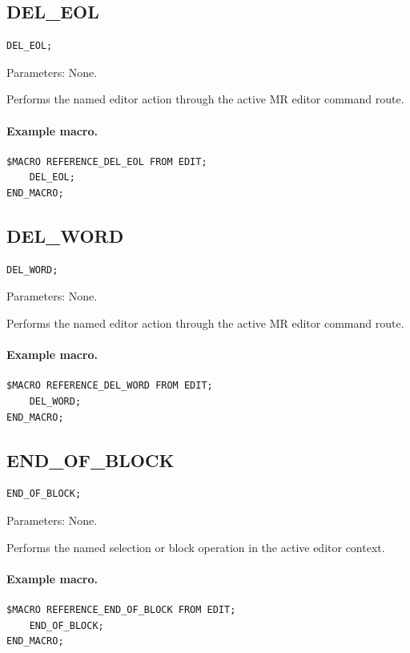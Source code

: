\documentclass[a4paper,10pt,twoside,openany]{book}
\newenvironment{mrmacextension}{\begin{changebar}}{\end{changebar}}
\begin{document}
\begin{mrmacextension}
\label{prim:procedure-del-eol}
\subsection*{DEL\_EOL}
\begin{verbatim}
DEL_EOL;
\end{verbatim}
Parameters: None.

Performs the named editor action through the active MR editor command route.

\paragraph{Example macro.}
\begin{verbatim}
$MACRO REFERENCE_DEL_EOL FROM EDIT;
    DEL_EOL;
END_MACRO;
\end{verbatim}
\end{mrmacextension}

\begin{mrmacextension}
\label{prim:procedure-del-word}
\subsection*{DEL\_WORD}
\begin{verbatim}
DEL_WORD;
\end{verbatim}
Parameters: None.

Performs the named editor action through the active MR editor command route.

\paragraph{Example macro.}
\begin{verbatim}
$MACRO REFERENCE_DEL_WORD FROM EDIT;
    DEL_WORD;
END_MACRO;
\end{verbatim}
\end{mrmacextension}

\begin{mrmacextension}
\label{prim:procedure-end-of-block}
\subsection*{END\_OF\_BLOCK}
\begin{verbatim}
END_OF_BLOCK;
\end{verbatim}
Parameters: None.

Performs the named selection or block operation in the active editor context.

\paragraph{Example macro.}
\begin{verbatim}
$MACRO REFERENCE_END_OF_BLOCK FROM EDIT;
    END_OF_BLOCK;
END_MACRO;
\end{verbatim}
\end{mrmacextension}
\end{document}
